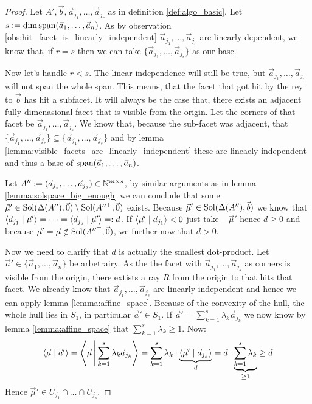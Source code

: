 \begin{proof}
    Let $A', \vec b, \vec a_{j_1}, \dots, \vec a_{j_r}$ as in definition \ref{def:algo_basic}. Let $s := \dim\operatorname{span}(\vec a_1, \dots, \vec a_n)$. As by observation \ref{obs:hit_facet_is_linearly_independent} $\vec a_{j_1}, \dots, \vec a_{j_r}$ are linearly dependent, we know that, if $r = s$ then we can take $\{\vec a_{j_1}, \dots, \vec a_{j_r}\}$ as our base.
    
    Now let's handle $r < s$. The linear independence will still be true, but $\vec a_{j_1}, \dots, \vec a_{j_r}$ will not span the whole span. This means, that the facet that got hit by the rey to $\vec b$ has hit a subfacet. It will always be the case that, there exists an adjacent fully dimenasional facet that is visible from the origin. Let the corners of that facet be $\vec a_{j_1}, \dots, \vec a_{j_s}$. We know that, because the sub-facet was adjacent, that $\{\vec a_{j_1}, \dots, \vec a_{j_r}\} \subseteq \{\vec a_{j_1}, \dots, \vec a_{j_s}\}$ and by lemma \ref{lemma:visible_facets_are_linearly_independent} these are lineaely independent and thus a base of $\operatorname{span}(\vec a_1, \dots, \vec a_n)$. 

    Let $A'' := (\vec a_{j_1}, \dots, \vec a_{j_s}) \in \mathbb{N}^{m\times s}$, by similar arguments as in lemma \ref{lemma:solspace_big_enough} we can conclude that some $\vec\mu' \in \operatorname{Sol}(\Delta(A''), \vec 0) \setminus \operatorname{Sol}(A''^\top, \vec 0)$ exists. Because $\vec\mu' \in \operatorname{Sol}(\Delta(A''), \vec b)$ we know that $\langle \vec a_{j_1} \mid \vec\mu' \rangle = \dots = \langle \vec a_{j_s} \mid \vec\mu' \rangle =: d$. If $\langle \vec\mu' \mid \vec a_{j_1} \rangle < 0$ just take $-\vec\mu'$ hence $d \geq 0$ and because $\vec\mu' = \vec\mu \notin \operatorname{Sol}(A''^\top, \vec 0)$, we further now that $d > 0$.

    Now we need to clarify that $d$ is actually the smallest dot-product. Let $\vec a' \in \{\vec a_1, \dots, \vec a_n\}$ be arbetrairy. As the the facet with $\vec a_{j_1}, \dots, \vec a_{j_s}$ as corners is visible from the origin, there extists a ray $R$ from the origin to that hits that facet. We already know that $\vec a_{j_1}, \dots, \vec a_{j_s}$ are linearly independent and hence we can apply lemma \ref{lemma:affine_space}. Because of the convexity of the hull, the whole hull lies in $S_1$, in particular $\vec a' \in S_1$. If $\vec a' = \sum_{k=1}^s \lambda_k \vec a_{j_k}$ we now know by lemma \ref{lemma:affine_space} that $\sum_{k=1}^s \lambda_k \geq 1$. Now:
    $$\langle \vec\mu \mid \vec a' \rangle = \left\langle \vec\mu \,\middle|\, \sum_{k=1}^s \lambda_k \vec a_{j_k} \right\rangle = \sum_{k=1}^s\lambda_k \cdot \underbrace{\langle \vec\mu' \mid \vec a_{j_k} \rangle}_d = d\cdot \underbrace{\sum_{k=1}^s\lambda_k}_{\geq 1} \geq d$$
    Hence $\vec\mu' \in U_{j_1} \cap \dots \cap U_{j_s}$. 
    

\end{proof}
